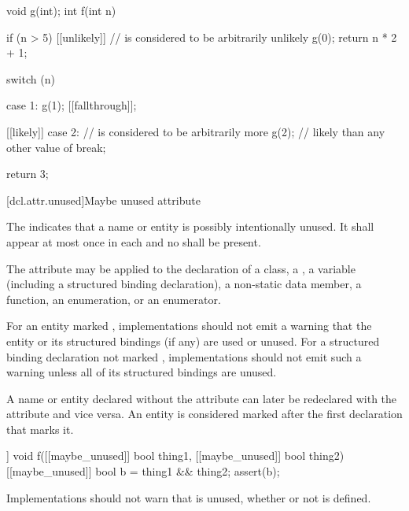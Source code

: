 \pnum
\begin{example}
\begin{codeblock}
void g(int);
int f(int n) {
  if (n > 5) [[unlikely]] {     //  is considered to be arbitrarily unlikely
    g(0);
    return n * 2 + 1;
  }

  switch (n) {
  case 1:
    g(1);
    [[fallthrough]];

  [[likely]] case 2:            //  is considered to be arbitrarily more
    g(2);                       // likely than any other value of 
    break;
  }
  return 3;
}
\end{codeblock}
\end{example}

[dcl.attr.unused]{Maybe unused attribute}%

\pnum
The  
indicates that a name or entity is possibly intentionally unused.
It shall appear at most once in each  and
no  shall be present.

\pnum
The attribute may be applied to the declaration of a class,
a ,
a variable (including a structured binding declaration),
a non-static data member,
a function, an enumeration, or an enumerator.

\pnum
For an entity marked ,
implementations should not emit a warning
that the entity or its structured bindings (if any)
are used or unused.
For a structured binding declaration not marked ,
implementations should not emit such a warning unless
all of its structured bindings are unused.

\pnum
A name or entity declared without the  attribute
can later be redeclared with the attribute
and vice versa.
An entity is considered marked
after the first declaration that marks it.

\pnum
\begin{example}
\begin{codeblock}
[[maybe_unused]] void f([[maybe_unused]] bool thing1,
                        [[maybe_unused]] bool thing2) {
  [[maybe_unused]] bool b = thing1 && thing2;
  assert(b);
}
\end{codeblock}
Implementations should not warn that  is unused,
whether or not  is defined.
\end{example}


